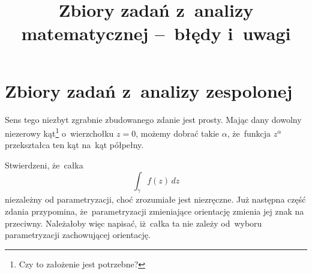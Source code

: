 \documentclass[a4paper,11pt]{article}
\title{Zbiory zadań z~analizy matematycznej --~błędy i~uwagi}
\begin{document}



\maketitle  %















\newpage
\section{Zbiory zadań z~analizy zespolonej}

\vspace{\spaceTwo}






\start {} Sens tego niezbyt zgrabnie zbudowanego zdanie
jest prosty. Mając dany dowolny niezerowy kąt\footnote{Czy to
  założenie jest potrzebne?} o~wierzchołku $z = 0$, możemy dobrać
takie $\alpha$, że~funkcja $z^{ \alpha }$ przekształca ten kąt na~kąt półpełny.

\vspace{\spaceFour}


\start {} Stwierdzeni, że~całka
\begin{equation}
  \label{eq:Krzyz-01}
  \int_{ \gamma } f( z )\, dz
\end{equation}
niezależny od parametryzacji, choć zrozumiałe jest niezręczne. Już
następna część zdania przypomina, że~parametryzacji zmieniające
orientację zmienia jej znak na przeciwny. Należałoby więc napisać,
iż~całka ta nie zależy od~wyboru parametryzacji zachowującej
orientację.
\end{document}
